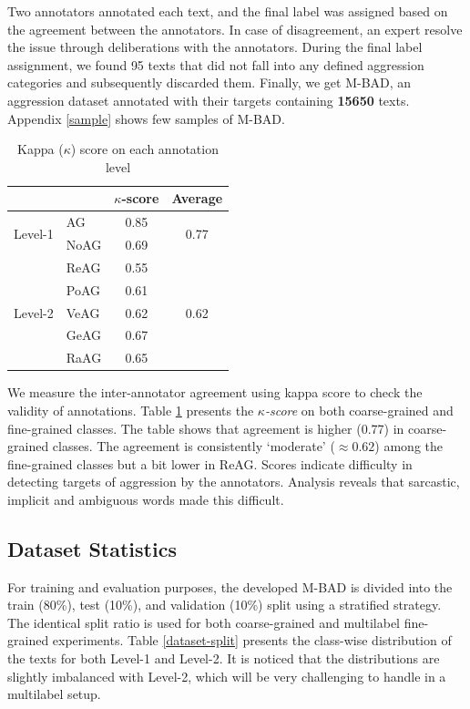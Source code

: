 \documentclass[11pt]{article}
\begin{document}
Two annotators annotated each text, and the final label was assigned based on the agreement between the annotators. In case of disagreement, an expert resolve the issue through deliberations with the annotators. During the final label assignment, we found {95} texts that did not fall into any defined aggression categories and subsequently discarded them. Finally, we get M-BAD, an aggression dataset annotated with their targets containing \textbf{15650} texts. Appendix \ref{sample} shows few samples of M-BAD.  

\begin{table}[h!]
\begin{center}
\small
\begin{tabular}{llcc}
\hline
 &  & \textbf{$\kappa$-score}  & \textbf{Average}\\
\hline
\multirow{2}{*}{Level-1}& AG & 0.85 &\multirow{2}{*}{0.77} \\
& NoAG & 0.69 & \\
\hline
\multirow{5}{*}{Level-2}& ReAG & 0.55  & \multirow{5}{*}{0.62} \\
& PoAG & 0.61 &    \\
& VeAG & 0.62 &      \\
& GeAG  & 0.67 &    \\
& RaAG & 0.65 & \\
\hline 
 
\end{tabular}
\caption{Kappa ($\kappa$) score on each annotation level}
\label{kappa-score}
\end{center}
\end{table}
We measure the inter-annotator agreement using kappa score \cite{cohen} to check the validity of annotations. Table \ref{kappa-score} presents the \textit{$\kappa$-score} on both coarse-grained and fine-grained classes. The table shows that agreement is higher (0.77) in coarse-grained classes. The agreement is consistently `moderate' ($\approx0.62$) among the fine-grained classes but a bit lower in ReAG. Scores indicate difficulty in detecting targets of aggression by the annotators. Analysis reveals that sarcastic, implicit and ambiguous words made this difficult.


\subsection{Dataset Statistics}
For training and evaluation purposes, the developed M-BAD is divided into the train (80\%), test (10\%), and validation (10\%) split using a stratified strategy. The identical split ratio is used for both coarse-grained and multilabel fine-grained experiments. Table \ref{dataset-split} presents the class-wise distribution of the texts for both Level-1 and Level-2. It is noticed that the distributions are slightly imbalanced with Level-2, which will be very challenging to handle in a multilabel setup.
\end{document}
